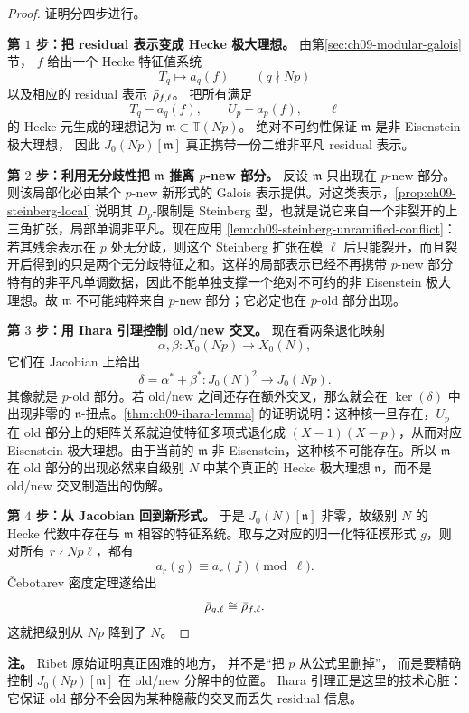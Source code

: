 \begin{proof}
证明分四步进行。

\textbf{第 $1$ 步：把 residual 表示变成 Hecke 极大理想。}
由第\ref{sec:ch09-modular-galois}节，
$f$ 给出一个 Hecke 特征值系统
\[
  T_q\mapsto a_q(f)
  \qquad (q\nmid Np)
\]
以及相应的 residual 表示 $\bar{\rho}_{f,\ell}$。
把所有满足
\[
  T_q-a_q(f),\qquad U_p-a_p(f),\qquad \ell
\]
的 Hecke 元生成的理想记为 $\mathfrak m\subset \mathbb T(Np)$。
绝对不可约性保证 $\mathfrak m$ 是非 Eisenstein 极大理想，
因此 $J_0(Np)[\mathfrak m]$ 真正携带一份二维非平凡 residual 表示。

\textbf{第 $2$ 步：利用无分歧性把 $\mathfrak m$ 推离 $p$-new 部分。}
反设 $\mathfrak m$ 只出现在 $p$-new 部分。则该局部化必由某个 $p$-new 新形式的 Galois 表示提供。对这类表示，\cref{prop:ch09-steinberg-local} 说明其 $D_p$-限制是 Steinberg 型，也就是说它来自一个非裂开的上三角扩张，局部单调非平凡。现在应用 \cref{lem:ch09-steinberg-unramified-conflict}：若其残余表示在 $p$ 处无分歧，则这个 Steinberg 扩张在模 $\ell$ 后只能裂开，而且裂开后得到的只是两个无分歧特征之和。这样的局部表示已经不再携带 $p$-new 部分特有的非平凡单调数据，因此不能单独支撑一个绝对不可约的非 Eisenstein 极大理想。故 $\mathfrak m$ 不可能纯粹来自 $p$-new 部分；它必定也在 $p$-old 部分出现。

\textbf{第 $3$ 步：用 Ihara 引理控制 old/new 交叉。}
现在看两条退化映射
\[
  \alpha,\beta\colon X_0(Np)\to X_0(N),
\]
它们在 Jacobian 上给出
\[
  \delta=\alpha^*+\beta^*\colon J_0(N)^2\to J_0(Np).
\]
其像就是 $p$-old 部分。若 old/new 之间还存在额外交叉，那么就会在 $\ker(\delta)$ 中出现非零的 $\mathfrak n$-扭点。\cref{thm:ch09-ihara-lemma} 的证明说明：这种核一旦存在，$U_p$ 在 old 部分上的矩阵关系就迫使特征多项式退化成 $(X-1)(X-p)$，从而对应 Eisenstein 极大理想。由于当前的 $\mathfrak m$ 非 Eisenstein，这种核不可能存在。所以 $\mathfrak m$ 在 old 部分的出现必然来自级别 $N$ 中某个真正的 Hecke 极大理想 $\mathfrak n$，而不是 old/new 交叉制造出的伪解。

\textbf{第 $4$ 步：从 Jacobian 回到新形式。}
于是 $J_0(N)[\mathfrak n]$ 非零，故级别 $N$ 的 Hecke 代数中存在与 $\mathfrak m$ 相容的特征系统。取与之对应的归一化特征模形式 $g$，则对所有 $r\nmid Np\ell$，都有
\[
  a_r(g)\equiv a_r(f)\pmod{\ell}.
\]
Čebotarev 密度定理遂给出
\[
  \bar{\rho}_{g,\ell}\cong \bar{\rho}_{f,\ell}.
\]
这就把级别从 $Np$ 降到了 $N$。
\end{proof}

\textbf{注。}
Ribet 原始证明真正困难的地方，
并不是“把 $p$ 从公式里删掉”，
而是要精确控制 $J_0(Np)[\mathfrak m]$ 在 old/new 分解中的位置。
Ihara 引理正是这里的技术心脏：
它保证 old 部分不会因为某种隐蔽的交叉而丢失 residual 信息。

